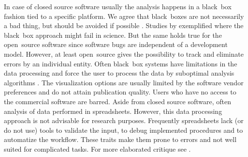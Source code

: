 In case of closed source software usually the analysis happens in a black~box 
fashion tied to a specific platform. We agree that black~boxes are not 
necessarily a bad thing, but should be avoided if possible 
\citep{roediger_RJ_2013, Spiess_2014}. Studies by \citet{mccullough_2008, 
Almiron_2010, Duran_2014} exemplified where the black~box approach might fail in 
science. But the same holds true for the open~source software since software 
bugs are independent of a development model. However, at least open~source gives 
the possibility to track and eliminate  errors by an individual entity. Often 
black~box systems have limitations in the data processing and force the user to 
process the data by suboptimal analysis algorithms \citep{ruijter_2013}. The 
visualization options are usually limited by the software vendor preferences and 
do not attain publication quality. Users who have no access to the commercial 
software are barred. Aside from closed source software, often analysis of data 
performed in spreadsheets. However, this data processing approach is not 
advisable for research purposes. Frequently spreadsheets  lack (or do not use) 
tools to validate the input, to debug implemented procedures and to automatize 
the workflow. These traits make them prone to errors and not well suited for 
complicated tasks. For more elaborated critique see \citet{mccullough_2008, 
burns_2014}.

